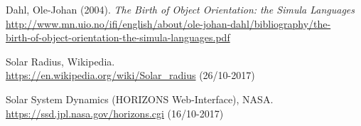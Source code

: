 \documentclass[12pt, a4paper]{article}
\begin{document}
\begin{thebibliography}{40}

 Dahl, Ole-Johan (2004). \textit{The Birth of Object Orientation:  the Simula
Languages} \\
\href{http://www.mn.uio.no/ifi/english/about/ole-johan-dahl/bibliography/the-birth-of-object-orientation-the-simula-languages.pdf}{http://www.mn.uio.no/ifi/english/about/ole-johan-dahl/bibliography/the-\\birth-of-object-orientation-the-simula-languages.pdf}

 Solar Radius, Wikipedia. \\ 
\href{https://en.wikipedia.org/wiki/Solar\_radius}{https://en.wikipedia.org/wiki/Solar\_radius} 
(26/10-2017)

 Solar System Dynamics (HORIZONS Web-Interface), NASA. \\
\href{https://ssd.jpl.nasa.gov/horizons.cgi}{https://ssd.jpl.nasa.gov/horizons.cgi} (16/10-2017)


\end{thebibliography}
\end{document}
